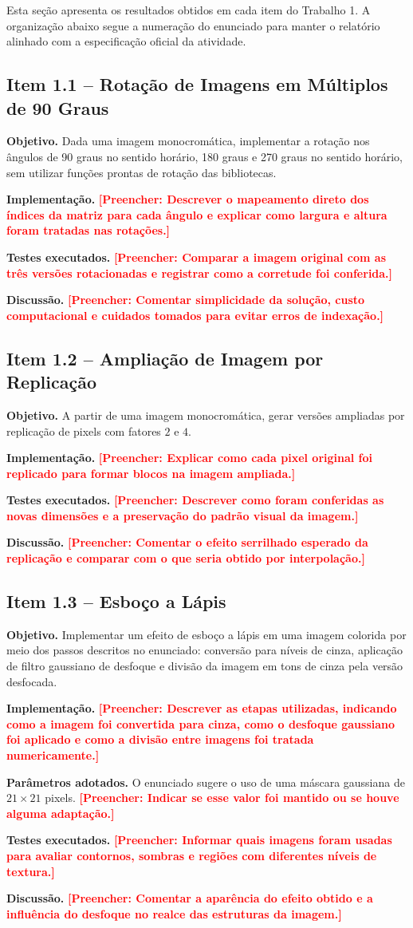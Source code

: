 \documentclass[12pt,a4paper]{article}
\newcommand{\placeholder}[1]{\textcolor{red}{\textbf{[Preencher: #1]}}}
\newcommand{\campo}[2]{\textbf{#1.} #2\par}
\begin{document}
Esta seção apresenta os resultados obtidos em cada item do Trabalho 1. A organização abaixo segue a numeração do enunciado para manter o relatório alinhado com a especificação oficial da atividade.

\subsection{Item 1.1 -- Rotação de Imagens em Múltiplos de 90 Graus}

\campo{Objetivo}{Dada uma imagem monocromática, implementar a rotação nos ângulos de 90 graus no sentido horário, 180 graus e 270 graus no sentido horário, sem utilizar funções prontas de rotação das bibliotecas.}
\campo{Implementação}{\placeholder{Descrever o mapeamento direto dos índices da matriz para cada ângulo e explicar como largura e altura foram tratadas nas rotações.}}
\campo{Testes executados}{\placeholder{Comparar a imagem original com as três versões rotacionadas e registrar como a corretude foi conferida.}}
\campo{Discussão}{\placeholder{Comentar simplicidade da solução, custo computacional e cuidados tomados para evitar erros de indexação.}}

\subsection{Item 1.2 -- Ampliação de Imagem por Replicação}

\campo{Objetivo}{A partir de uma imagem monocromática, gerar versões ampliadas por replicação de pixels com fatores $2$ e $4$.}
\campo{Implementação}{\placeholder{Explicar como cada pixel original foi replicado para formar blocos na imagem ampliada.}}
\campo{Testes executados}{\placeholder{Descrever como foram conferidas as novas dimensões e a preservação do padrão visual da imagem.}}
\campo{Discussão}{\placeholder{Comentar o efeito serrilhado esperado da replicação e comparar com o que seria obtido por interpolação.}}

\subsection{Item 1.3 -- Esboço a Lápis}

\campo{Objetivo}{Implementar um efeito de esboço a lápis em uma imagem colorida por meio dos passos descritos no enunciado: conversão para níveis de cinza, aplicação de filtro gaussiano de desfoque e divisão da imagem em tons de cinza pela versão desfocada.}
\campo{Implementação}{\placeholder{Descrever as etapas utilizadas, indicando como a imagem foi convertida para cinza, como o desfoque gaussiano foi aplicado e como a divisão entre imagens foi tratada numericamente.}}
\campo{Parâmetros adotados}{O enunciado sugere o uso de uma máscara gaussiana de $21 \times 21$ pixels. \placeholder{Indicar se esse valor foi mantido ou se houve alguma adaptação.}}
\campo{Testes executados}{\placeholder{Informar quais imagens foram usadas para avaliar contornos, sombras e regiões com diferentes níveis de textura.}}
\campo{Discussão}{\placeholder{Comentar a aparência do efeito obtido e a influência do desfoque no realce das estruturas da imagem.}}
\end{document}
